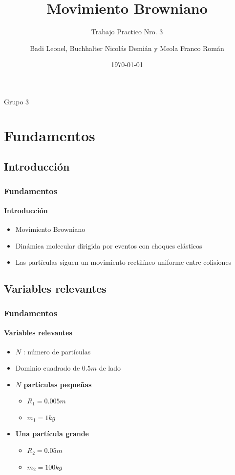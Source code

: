 \documentclass[hyperref={pdfpagelayout=SinglePage}]{beamer}
\title{Movimiento Browniano}
\subtitle{Trabajo Practico Nro. 3}
\author{Badi Leonel, Buchhalter Nicolás Demián y Meola Franco Román}
\date{\today}
\begin{document}
\renewcommand{\figurename}{Grafico}

\begin{frame}[plain]
    \frametitle{} 
    \titlepage
    \centering
	Grupo 3
\end{frame}

\section{Fundamentos}

\subsection{Introducción}

\begin{frame}
\frametitle{Fundamentos}
\framesubtitle{Introducción}
\begin{itemize}
	\item Movimiento Browniano
	\item Dinámica molecular dirigida por eventos con choques elásticos
	\item Las partículas siguen un movimiento rectilíneo uniforme entre colisiones
\end{itemize}
\end{frame}

\subsection{Variables relevantes}

\begin{frame}
\frametitle{Fundamentos}
\framesubtitle{Variables relevantes}
\begin{itemize}
	\item $N$ : número de partículas
	\item Dominio cuadrado de $0.5 m$ de lado
	\item \textbf{$N$ partículas pequeñas}
	\begin{itemize}
		\item $R_{1} = 0.005 m$
		\item $m_{1} = 1 kg$
	\end{itemize}
	\item \textbf{Una partícula grande}
	\begin{itemize}
		\item $R_{2} = 0.05 m$
		\item $m_{2} = 100 kg$
	\end{itemize}
\end{itemize}
\end{frame}
\end{document}
